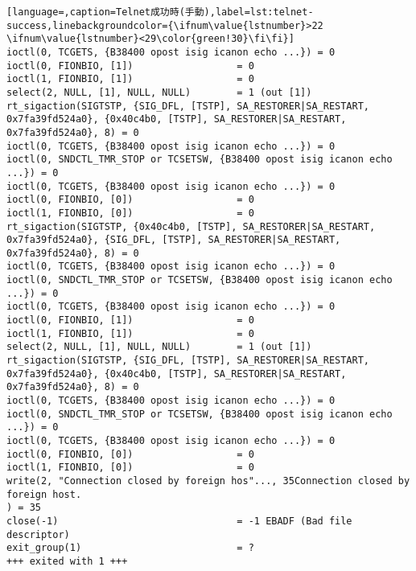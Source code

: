 \begin{lstlisting}[language=,caption=Telnet成功時(手動),label=lst:telnet-success,linebackgroundcolor={\ifnum\value{lstnumber}>22 \ifnum\value{lstnumber}<29\color{green!30}\fi\fi}]
ioctl(0, TCGETS, {B38400 opost isig icanon echo ...}) = 0
ioctl(0, FIONBIO, [1])                  = 0
ioctl(1, FIONBIO, [1])                  = 0
select(2, NULL, [1], NULL, NULL)        = 1 (out [1])
rt_sigaction(SIGTSTP, {SIG_DFL, [TSTP], SA_RESTORER|SA_RESTART, 0x7fa39fd524a0}, {0x40c4b0, [TSTP], SA_RESTORER|SA_RESTART, 0x7fa39fd524a0}, 8) = 0
ioctl(0, TCGETS, {B38400 opost isig icanon echo ...}) = 0
ioctl(0, SNDCTL_TMR_STOP or TCSETSW, {B38400 opost isig icanon echo ...}) = 0
ioctl(0, TCGETS, {B38400 opost isig icanon echo ...}) = 0
ioctl(0, FIONBIO, [0])                  = 0
ioctl(1, FIONBIO, [0])                  = 0
rt_sigaction(SIGTSTP, {0x40c4b0, [TSTP], SA_RESTORER|SA_RESTART, 0x7fa39fd524a0}, {SIG_DFL, [TSTP], SA_RESTORER|SA_RESTART, 0x7fa39fd524a0}, 8) = 0
ioctl(0, TCGETS, {B38400 opost isig icanon echo ...}) = 0
ioctl(0, SNDCTL_TMR_STOP or TCSETSW, {B38400 opost isig icanon echo ...}) = 0
ioctl(0, TCGETS, {B38400 opost isig icanon echo ...}) = 0
ioctl(0, FIONBIO, [1])                  = 0
ioctl(1, FIONBIO, [1])                  = 0
select(2, NULL, [1], NULL, NULL)        = 1 (out [1])
rt_sigaction(SIGTSTP, {SIG_DFL, [TSTP], SA_RESTORER|SA_RESTART, 0x7fa39fd524a0}, {0x40c4b0, [TSTP], SA_RESTORER|SA_RESTART, 0x7fa39fd524a0}, 8) = 0
ioctl(0, TCGETS, {B38400 opost isig icanon echo ...}) = 0
ioctl(0, SNDCTL_TMR_STOP or TCSETSW, {B38400 opost isig icanon echo ...}) = 0
ioctl(0, TCGETS, {B38400 opost isig icanon echo ...}) = 0
ioctl(0, FIONBIO, [0])                  = 0
ioctl(1, FIONBIO, [0])                  = 0
write(2, "Connection closed by foreign hos"..., 35Connection closed by foreign host.
) = 35
close(-1)                               = -1 EBADF (Bad file descriptor)
exit_group(1)                           = ?
+++ exited with 1 +++
\end{lstlisting}

